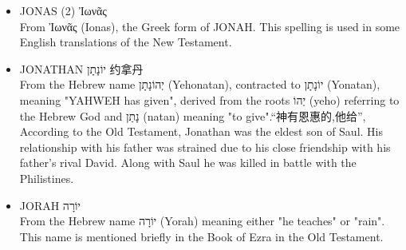 \begin{itemize}
\item JONAS (2) Ἰωνᾶς \\
From Ἰωνᾶς (Ionas), the Greek form of JONAH. This spelling is used in some English translations of the New Testament.
\item JONATHAN יוֹנָתָן 约拿丹\\
From the Hebrew name יְהוֹנָתָן (Yehonatan), contracted to יוֹנָתָן (Yonatan), meaning "YAHWEH has given", derived from the roots יְהוֹ (yeho) referring to the Hebrew God and נָתַן (natan) meaning "to give".“神有恩惠的,他给”, According to the Old Testament, Jonathan was the eldest son of Saul. His relationship with his father was strained due to his close friendship with his father's rival David. Along with Saul he was killed in battle with the Philistines.
\item JORAH יוֹרָה \\
From the Hebrew name יוֹרָה (Yorah) meaning either "he teaches" or "rain". This name is mentioned briefly in the Book of Ezra in the Old Testament. 


\end{itemize}
